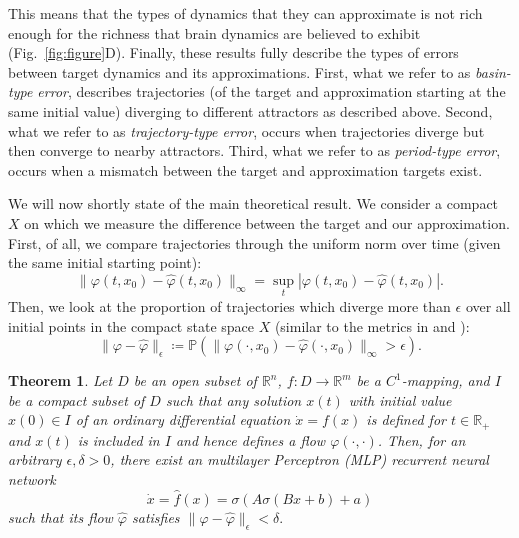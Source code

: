 \documentclass[10pt]{article}
\newtheorem{theorem}{Theorem}
\newcommand{\reals}{\mathbb{R}}
\begin{document}
    This means that the types of dynamics that they can approximate is not rich enough for the richness that brain dynamics are believed to exhibit (Fig.~\ref{fig:figure}D). 
Finally, these results fully describe the types of errors between target dynamics and its approximations.
  First, what we refer to as \emph{basin-type error}, describes trajectories (of the target and approximation starting at the same initial value) diverging to different attractors as described above.
  Second, what we refer to as \emph{trajectory-type error}, occurs when trajectories diverge but then converge to nearby attractors. %
  Third, what we refer to as \emph{period-type error}, occurs when a mismatch between the target and approximation targets exist.
  
We will now shortly state of the main theoretical result.
We consider a compact $X$ on which we measure the difference between the target and our approximation.
First, of all, we compare trajectories through the uniform norm over time (given the same initial starting point):
\begin{equation}
\|\varphi(t,x_0)-\hat \varphi(t,x_0)\|_\infty = \sup_t|\varphi(t,x_0)-\hat \varphi(t,x_0)|.
\end{equation}
Then, we look at the proportion of trajectories which diverge more than $\epsilon$ over all initial points in the compact state space $X$ (similar to the metrics in \citep{hammer2000approximation} and \citep{hanson2021learning}):
\begin{equation}
\|\varphi-\hat \varphi\|_\epsilon \coloneqq  \mathbb{P}\left(\|\varphi(\cdot,x_0)-\hat \varphi(\cdot,x_0)\|_\infty>\epsilon\right).
\end{equation}

\vspace{-.3cm}
\begin{theorem}
Let $D$ be an open subset of $\mathbb{R}^n$, $f\colon D \to \mathbb{R}^m$ be a $C^1$-mapping, and $I$ be a compact subset of $D$ such that any solution $x(t)$ with initial value $x(0) \in I$ of an ordinary differential equation $\dot{x} = f(x)$ is defined for $t\in\reals_{+}$ and $x(t)$ is included in $I$ and hence defines a flow $\varphi(\cdot, \cdot)$.
 Then, for an arbitrary $\epsilon, \delta > 0$, there exist an multilayer Perceptron (MLP) recurrent neural network 
 \begin{equation}
\dot x = \hat f(x) = \sigma(A\sigma(Bx+b)+a)
\end{equation}
such that its flow $\hat \varphi$ satisfies $\|\varphi-\hat \varphi\|_\epsilon < \delta.$
\end{theorem}
\end{document}
